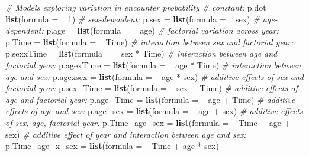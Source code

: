 \documentclass[]{article}
\newenvironment{Shaded}{\begin{snugshade}}{\end{snugshade}}
\newcommand{\KeywordTok}[1]{\textcolor[rgb]{0.13,0.29,0.53}{\textbf{{#1}}}}
\newcommand{\DataTypeTok}[1]{\textcolor[rgb]{0.13,0.29,0.53}{{#1}}}
\newcommand{\DecValTok}[1]{\textcolor[rgb]{0.00,0.00,0.81}{{#1}}}
\newcommand{\StringTok}[1]{\textcolor[rgb]{0.31,0.60,0.02}{{#1}}}
\newcommand{\CommentTok}[1]{\textcolor[rgb]{0.56,0.35,0.01}{\textit{{#1}}}}
\newcommand{\NormalTok}[1]{{#1}}
\begin{document}
\begin{Shaded}
\begin{Highlighting}[]
    \CommentTok{# Models exploring variation in encounter probability}
    \CommentTok{# constant:}
    \NormalTok{p.dot =}\StringTok{ }\KeywordTok{list}\NormalTok{(}\DataTypeTok{formula =}  \NormalTok{~}\StringTok{ }\DecValTok{1}\NormalTok{)}
    \CommentTok{# sex-dependent:}
    \NormalTok{p.sex =}\StringTok{ }\KeywordTok{list}\NormalTok{(}\DataTypeTok{formula =}  \NormalTok{~}\StringTok{ }\NormalTok{sex)}
    \CommentTok{# age-dependent:}
    \NormalTok{p.age =}\StringTok{ }\KeywordTok{list}\NormalTok{(}\DataTypeTok{formula =}  \NormalTok{~}\StringTok{ }\NormalTok{age)}
    \CommentTok{# factorial variation across year:}
    \NormalTok{p.Time =}\StringTok{ }\KeywordTok{list}\NormalTok{(}\DataTypeTok{formula =}  \NormalTok{~}\StringTok{ }\NormalTok{Time)}
    \CommentTok{# interaction between sex and factorial year:}
    \NormalTok{p.sexxTime =}\StringTok{ }\KeywordTok{list}\NormalTok{(}\DataTypeTok{formula =}  \NormalTok{~}\StringTok{ }\NormalTok{sex *}\StringTok{ }\NormalTok{Time)}
    \CommentTok{# interaction between age and factorial year:}
    \NormalTok{p.agexTime =}\StringTok{ }\KeywordTok{list}\NormalTok{(}\DataTypeTok{formula =}  \NormalTok{~}\StringTok{ }\NormalTok{age *}\StringTok{ }\NormalTok{Time)}
    \CommentTok{# interaction between age and sex:}
    \NormalTok{p.agexsex =}\StringTok{ }\KeywordTok{list}\NormalTok{(}\DataTypeTok{formula =}  \NormalTok{~}\StringTok{ }\NormalTok{age *}\StringTok{ }\NormalTok{sex)}
    \CommentTok{# additive effects of sex and factorial year:}
    \NormalTok{p.sex_Time =}\StringTok{ }\KeywordTok{list}\NormalTok{(}\DataTypeTok{formula =}  \NormalTok{~}\StringTok{ }\NormalTok{sex +}\StringTok{ }\NormalTok{Time)}
    \CommentTok{# additive effects of age and factorial year:}
    \NormalTok{p.age_Time =}\StringTok{ }\KeywordTok{list}\NormalTok{(}\DataTypeTok{formula =}  \NormalTok{~}\StringTok{ }\NormalTok{age +}\StringTok{ }\NormalTok{Time)}
    \CommentTok{# additive effects of age and sex:}
    \NormalTok{p.age_sex =}\StringTok{ }\KeywordTok{list}\NormalTok{(}\DataTypeTok{formula =}  \NormalTok{~}\StringTok{ }\NormalTok{age +}\StringTok{ }\NormalTok{sex)}
    \CommentTok{# additive effects of sex, age, factorial year:}
    \NormalTok{p.Time_age_sex =}\StringTok{ }\KeywordTok{list}\NormalTok{(}\DataTypeTok{formula =}  \NormalTok{~}\StringTok{ }\NormalTok{Time +}\StringTok{ }\NormalTok{age +}\StringTok{ }\NormalTok{sex)}
    \CommentTok{# additive effect of year and interaction between age and sex:}
    \NormalTok{p.Time_age_x_sex =}\StringTok{ }\KeywordTok{list}\NormalTok{(}\DataTypeTok{formula =}  \NormalTok{~}\StringTok{ }\NormalTok{Time +}\StringTok{ }\NormalTok{age *}\StringTok{ }\NormalTok{sex)}
    

\end{Highlighting}
\end{Shaded}
\end{document}
